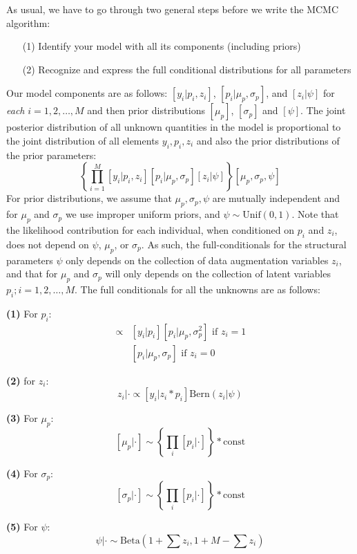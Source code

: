 As usual, we have to go through two general steps before we write the MCMC algorithm:
\begin{itemize}
\item[  (1)] Identify your model with all its components (including
    priors)
\item[  (2)] Recognize and express the full conditional distributions for
    all parameters
\end{itemize}
Our model components are as follows: $[y_{i}| p_{i},z_{i}]$,
$[p_{i}|\mu_{p},\sigma_{p}]$, and $[z_{i}|\psi]$
for {\it each} $i=1,2,\ldots,M$ and then prior distributions
$[\mu_{p}]$, $[\sigma_{p}]$ and $[\psi]$.
The joint posterior distribution of all unknown quantities in the model
is proportional to the joint distribution of all elements
$y_{i},p_{i},z_{i}$ and also the prior distributions of the prior parameters:
\[
\left\{ \prod_{i=1}^{M} [y_{i}|p_{i},z_{i}][p_{i}|\mu_{p},\sigma_{p}]
[z_{i}|\psi] \right\} [\mu_{p},\sigma_{p},\psi]
\]
For prior distributions, we assume that $\mu_{p},\sigma_{p}, \psi$ are
mutually independent and for $\mu_{p}$ and $\sigma_{p}$ we use
improper uniform priors, and $\psi \sim \mbox{Unif}(0,1)$.  Note that
the likelihood contribution for each individual, when conditioned on
$p_{i}$ and $z_{i}$, does not depend on $\psi$, $\mu_{p}$, or
$\sigma_{p}$.  As such, the full-conditionals for the structural
parameters $\psi$ only depends on the collection of data augmentation
variables $z_{i}$, and that for $\mu_{p}$ and $\sigma_{p}$ will only
depends on the collection of latent variables $p_{i}; i=1,2,\ldots,M$.
The full conditionals for all the unknowns are as follows:

{\bf (1)} For $p_{i}$:
\begin{eqnarray*}
[p_{i}|y_{i}, \mu_p, \sigma_{p},z_{i}=1] &\propto  &
[y_{i}|p_{i}][p_{i}|\mu_p,\sigma_{p}^{2}] \mbox{ if $z_{i}=1$ }  \\
                 &  &  [p_{i}|\mu_p,\sigma_{p}] \mbox{ if $z_{i}=0$ }
\end{eqnarray*}

{\bf (2)} for $z_{i}$:
\[
z_{i} | \cdot \propto [y_{i}|z_{i}*p_{i}] \mbox{Bern}(z_{i}|\psi)
\]

{\bf (3)} For $\mu_{p}$:
\[
[\mu_{p} | \cdot ] \sim \left\{ \prod_{i} [p_{i}| \cdot] \right\} *\mbox{const}
\]


{\bf (4)} For $\sigma_{p}$:
\[
[ \sigma_{p}|\cdot ] \sim \left\{ \prod_{i}[p_{i}| \cdot ] \right\} *\mbox{const}
\]

{\bf (5)} For $\psi$:
\[
\psi|\cdot\sim \mbox{Beta}(1 + \sum z_{i}, 1 + M - \sum z_{i})
\]


